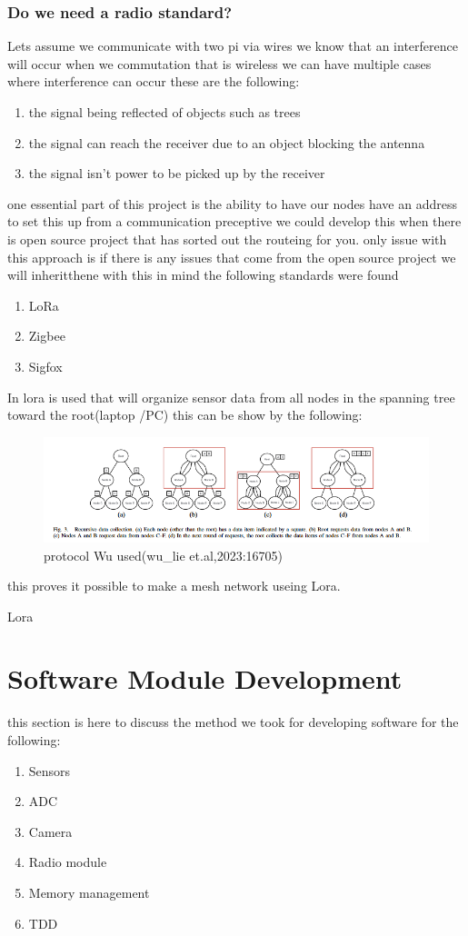 \subsubsection{Do we need a radio standard?}
Lets assume we communicate with two pi via wires  we know that an interference will occur when  we  commutation that is wireless
we can have multiple cases where interference can  occur these are  the following:
\begin{enumerate}
    \item the signal being reflected of objects such as  trees
    \item the signal can reach the  receiver due to an object blocking the antenna
    \item the signal isn't  power to be picked up by the receiver
\end{enumerate}
one essential part of this project is the  ability to have  our nodes have an address to set this up
from a communication preceptive we could develop this when there is open source project that has sorted out the routeing for  you.
only issue with this approach is if there is any issues that come from the open source project we will inheritthene
with this in mind the following standards were found
\begin{enumerate}
    \item LoRa
    \item Zigbee
    \item Sigfox
\end{enumerate}
In \cite{Wu_Liebeherr_2023} lora is used  that will organize sensor
data from all nodes in the spanning tree toward the root(laptop /PC) this can be show by the  following:
\begin{figure}[h!]
    \centering
    \includegraphics[width=0.5\linewidth]{Images/lora_example_routing_proto.png}
    \caption{protocol Wu used(wu\_lie et.al,2023:16705)}
    \label{protocol Wu used(wu_lie et.al,2023:16705)}
\end{figure}  
this proves it possible  to make a  mesh network useing Lora.
\par 
Lora  
\section{Software Module Development}
this section is here to discuss the method we took  for  developing software  for the  following:
\begin{enumerate}
    \item Sensors 
    \item ADC
    \item Camera
    \item Radio module
    \item Memory management
    \item  TDD
\end{enumerate}
